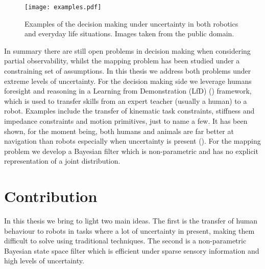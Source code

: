 
\begin{figure}
 \centering
 \texttt{[image: examples.pdf]}
 \caption{Examples of the decision making under uncertainty in both robotics and everyday life situations. Images taken from the public domain.}
\end{figure}

In summary there are still open problems in decision making when considering partial observability, whilst 
the mapping problem has been studied under a constraining set of assumptions. In this thesis we address both problems 
under extreme levels of uncertainty. 
For the decision making side we leverage humans foresight and reasoning in a Learning from Demonstration (LfD) (\cite{Billard08chapter})
framework, which is used to transfer skills from an expert teacher (usually a human) to a robot. Examples include the transfer of 
kinematic task constraints, stiffness and impedance constraints and motion primitives, just to name a few.
It has been shown, for the moment being, both humans and animals are far better at navigation than robots especially when 
uncertainty is present (\cite{stankiewicz2006lost}). For the mapping problem we develop a Bayesian filter which is non-parametric 
and has no explicit representation of a joint distribution.




\section{Contribution}

In this thesis we bring to light two main ideas. The first is the transfer of human behaviour to robots
in tasks where a lot of uncertainty in present, making them difficult to solve using traditional techniques.
The second is a non-parametric Bayesian state space filter which is efficient under sparse sensory information 
and high levels of uncertainty.

